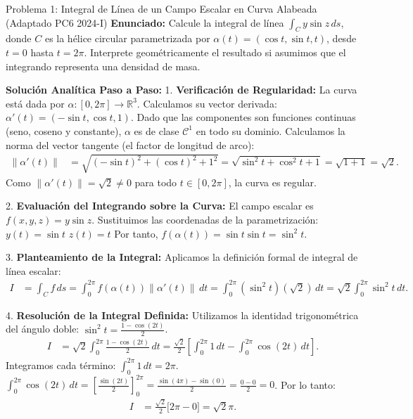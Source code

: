 \documentclass[11pt,a4paper]{article}
\begin{document}
\begin{ejerciciobox}{Problema 1: Integral de Línea de un Campo Escalar en Curva Alabeada (Adaptado PC6 2024-I)}
\textbf{Enunciado:}
Calcule la integral de línea $\int_C y \sin z \, ds$, donde $C$ es la hélice circular parametrizada por $\alpha(t) = (\cos t, \sin t, t)$, desde $t = 0$ hasta $t = 2\pi$. Interprete geométricamente el resultado si asumimos que el integrando representa una densidad de masa.

\textbf{Solución Analítica Paso a Paso:}
1. \textbf{Verificación de Regularidad:}
La curva está dada por $\alpha: [0, 2\pi] \to \mathbb{R}^3$.
Calculamos su vector derivada: $\alpha'(t) = (-\sin t, \cos t, 1)$.
Dado que las componentes son funciones continuas (seno, coseno y constante), $\alpha$ es de clase $\mathcal{C}^1$ en todo su dominio.
Calculamos la norma del vector tangente (el factor de longitud de arco):
\begin{align*}
\|\alpha'(t)\| &= \sqrt{(-\sin t)^2 + (\cos t)^2 + 1^2} = \sqrt{\sin^2 t + \cos^2 t + 1} = \sqrt{1 + 1} = \sqrt{2}.
\end{align*}
Como $\|\alpha'(t)\| = \sqrt{2} \neq 0$ para todo $t \in [0, 2\pi]$, la curva es regular.

2. \textbf{Evaluación del Integrando sobre la Curva:}
El campo escalar es $f(x,y,z) = y \sin z$.
Sustituimos las coordenadas de la parametrización:
$y(t) = \sin t$
$z(t) = t$
Por tanto, $f(\alpha(t)) = \sin t \sin t = \sin^2 t$.

3. \textbf{Planteamiento de la Integral:}
Aplicamos la definición formal de integral de línea escalar:
\begin{align*}
I &= \int_C f \, ds = \int_{0}^{2\pi} f(\alpha(t)) \|\alpha'(t)\| \, dt = \int_{0}^{2\pi} (\sin^2 t)(\sqrt{2}) \, dt = \sqrt{2} \int_{0}^{2\pi} \sin^2 t \, dt.
\end{align*}

4. \textbf{Resolución de la Integral Definida:}
Utilizamos la identidad trigonométrica del ángulo doble: $\sin^2 t = \frac{1 - \cos(2t)}{2}$.
\begin{align*}
I &= \sqrt{2} \int_{0}^{2\pi} \frac{1 - \cos(2t)}{2} \, dt = \frac{\sqrt{2}}{2} \left[ \int_{0}^{2\pi} 1 \, dt - \int_{0}^{2\pi} \cos(2t) \, dt \right].
\end{align*}
Integramos cada término:
$\int_{0}^{2\pi} 1 \, dt = 2\pi$.
$\int_{0}^{2\pi} \cos(2t) \, dt = \left[ \frac{\sin(2t)}{2} \right]_{0}^{2\pi} = \frac{\sin(4\pi) - \sin(0)}{2} = \frac{0 - 0}{2} = 0$.
Por lo tanto:
\begin{align*}
I &= \frac{\sqrt{2}}{2} \big[ 2\pi - 0 \big] = \sqrt{2}\pi.
\end{align*}


\end{ejerciciobox}
\end{document}
